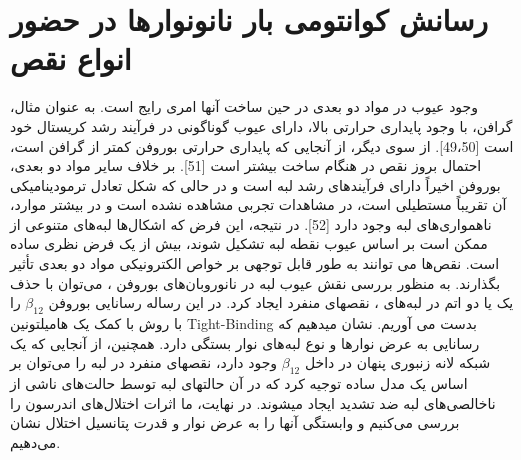 \section{رسانش کوانتومی بار نانونوارها در حضور انواع نقص}
وجود عیوب در مواد دو بعدی در حین ساخت آنها امری رایج است. به عنوان مثال، گرافن، با وجود پایداری حرارتی بالا، دارای عیوب گوناگونی در فرآیند رشد کریستال خود است [49،50]. از سوی دیگر، از آنجایی که پایداری حرارتی بوروفن کمتر از گرافن است، احتمال بروز نقص در هنگام ساخت بیشتر است [51]. بر خلاف سایر مواد دو بعدی، بوروفن اخیراً دارای فرآیندهای رشد لبه است و در حالی که شکل تعادل ترمودینامیکی آن تقریباً مستطیلی است، در مشاهدات تجربی مشاهده نشده است و در بیشتر موارد، ناهمواری‌های لبه وجود دارد [52]. در نتیجه، این فرض که اشکال‌ها لبه‌های متنوعی از ممکن است بر اساس عیوب نقطه لبه تشکیل شوند، بیش از یک فرض نظری ساده است. نقص‌ها می توانند به طور قابل توجهی بر خواص الکترونیکی مواد دو بعدی تأثیر بگذارند. به منظور بررسی نقش عیوب لبه در نانوروبان‌های بوروفن ، می‌توان با حذف یک یا دو اتم در لبه‌های ، نقصهای منفرد ایجاد کرد. در این رساله رسانایی بوروفن $\beta_{12}$ را با روش  با کمک یک هامیلتونین \gls{Tight-Binding} بدست می آوریم. نشان میدهیم که رسانایی به عرض نوارها و نوع لبه‌های نوار بستگی دارد. همچنین، از آنجایی که یک شبکه لانه زنبوری پنهان در داخل $\beta_{12}$ وجود دارد، نقصهای منفرد در لبه را می‌توان بر اساس یک مدل ساده توجیه کرد که در آن حالتهای لبه توسط حالت‌های ناشی از ناخالصی‌های لبه ضد تشدید ایجاد میشوند. در نهایت، ما اثرات اختلال‌های اندرسون را بررسی می‌کنیم و وابستگی آنها را به عرض نوار و قدرت پتانسیل اختلال نشان می‌دهیم.
